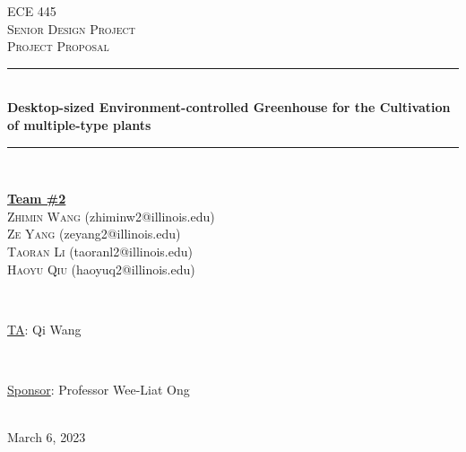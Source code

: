 \documentclass[12pt]{article}
\begin{document}
\begin{titlepage}
\newcommand{\HRule}{\rule{\linewidth}{0.1mm}} 
\center %
 
\textsc{\Large ECE 445}\\[0.5cm] %
\textsc{\large Senior Design Project}\\[0.5cm] %
\textsc{\Large Project Proposal }\\[0.5cm] %

\HRule \\[0.5cm]
\huge \textbf{Desktop-sized Environment-controlled Greenhouse for the Cultivation of multiple-type plants} %
\HRule \\[2cm]
 
\begin{minipage}{0.5\textwidth}
    \begin{center} \large
        \underline{\textbf{Team \#2}} \\ \medskip
        \textsc{Zhimin Wang} (zhiminw2@illinois.edu) \\
        \textsc{Ze Yang} (zeyang2@illinois.edu) \\
        \textsc{Taoran Li} (taoranl2@illinois.edu) \\
        \textsc{Haoyu Qiu} (haoyuq2@illinois.edu)%
    \end{center}
\end{minipage} \\[1.5cm]

\begin{minipage}{0.5\textwidth}
    \begin{center}
        \large
        \underline{TA}: Qi Wang
    \end{center}
\end{minipage} \\[1cm]

\begin{minipage}{0.5\textwidth}
    \begin{center}
        \large
        \underline{Sponsor}: Professor Wee-Liat Ong
    \end{center}
\end{minipage} \\[1cm]


{\large March 6, 2023} %

\vfill %

\end{titlepage}
\setcounter{page}{2}
\tableofcontents
\newpage
\end{document}
